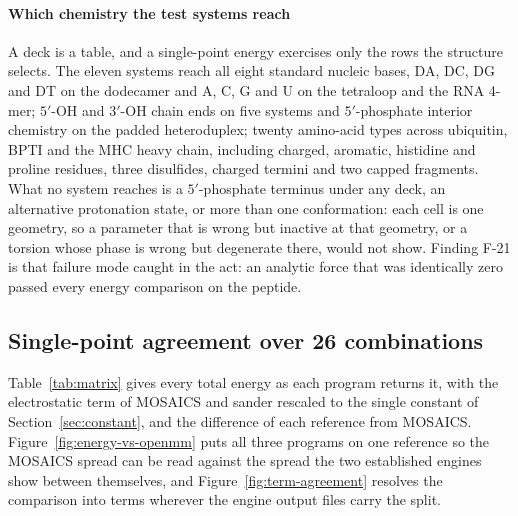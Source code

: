 \paragraph{Which chemistry the test systems reach}
A deck is a table, and a single-point energy exercises only the rows the
structure selects. The eleven systems reach all eight standard nucleic bases,
DA, DC, DG and DT on the dodecamer and A, C, G and U on the tetraloop and the
RNA 4-mer; $5'$-OH and $3'$-OH chain ends on five systems and $5'$-phosphate
interior chemistry on the padded heteroduplex; twenty amino-acid types across
ubiquitin, BPTI and the MHC heavy chain, including charged, aromatic,
histidine and proline residues, three disulfides, charged termini and two
capped fragments. What no system reaches is a $5'$-phosphate terminus under
any deck, an alternative protonation state, or more than one conformation: each
cell is one geometry, so a parameter that is wrong but inactive at that
geometry, or a torsion whose phase is wrong but degenerate there, would not
show. Finding F-21 is that failure mode caught in the act: an analytic force
that was identically zero passed every energy comparison on the peptide.

\subsection{Single-point agreement over 26 combinations}
\label{sec:matrix}

Table~\ref{tab:matrix} gives every total energy as each program returns it,
with the electrostatic term of MOSAICS and sander rescaled to the single
constant of Section~\ref{sec:constant}, and the difference of each reference
from MOSAICS. Figure~\ref{fig:energy-vs-openmm} puts all three programs on one
reference so the MOSAICS spread can be read against the spread the two
established engines show between themselves, and
Figure~\ref{fig:term-agreement} resolves the comparison into terms wherever the
engine output files carry the split.

\begin{table}[tbp]
\centering
\footnotesize
\setlength{\tabcolsep}{4pt}
\caption{Single-point total energies on the eleven systems, in \kcal{}, vacuum,
no cutoff, every electrostatic term on the CODATA-derived constant
$332.0637133$. A dash means that reference was not run for that cell, for the
reason given in Section~\ref{sec:coverage}. The right-hand block is the
reference minus MOSAICS. The 1efs CHARMM36 row is the 816-atom $5'$-OH
rebuild of the heteroduplex, not the 818-atom structure of the rows above it;
the 1F7Y decks are on an unmerged engine branch. Source:
\texttt{work/preprint-I/energies/MATRIX.json}, and the engine output files it
names; the table is written from that file by \texttt{make\_tables.py}.}
\label{tab:matrix}
\resizebox{\textwidth}{!}{}
\end{table}

